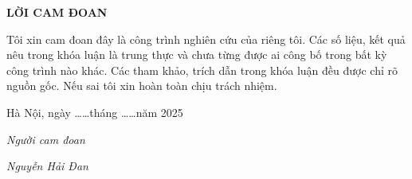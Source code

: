\documentclass{uetgraduation}
\begin{document}
\begin{contentlisting}
    \tableofcontents
    \listoffigures
    \listoftables

\end{contentlisting}

\newpage
\thispagestyle{empty}
\begin{center}
    \textbf{LỜI CAM ĐOAN}
\end{center}

Tôi xin cam đoan đây là công trình nghiên cứu của riêng tôi. Các số liệu, kết quả nêu trong khóa luận là trung thực và chưa từng được ai công bố trong bất kỳ công trình nào khác. Các tham khảo, trích dẫn trong khóa luận đều được chỉ rõ nguồn gốc. Nếu sai tôi xin hoàn toàn chịu trách nhiệm.

\begin{flushright}
    Hà Nội, ngày \ldots\ldots tháng \ldots\ldots năm 2025

    \vspace{2cm}
    \textit{Người cam đoan}

    \vspace{1cm}
    \textit{Nguyễn Hải Đan}
\end{flushright}






\end{document}
